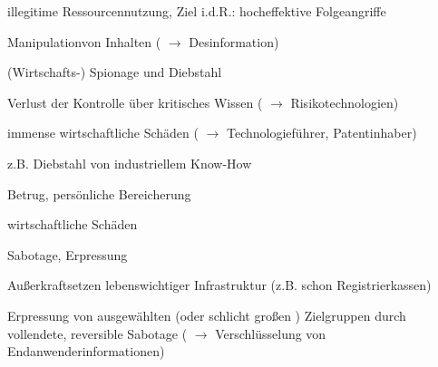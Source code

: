 \documentclass[a4paper]{article}
\begin{document}
\begin{multicols}{3}
    \begin{itemize*}
        \item
        illegitime Ressourcennutzung, Ziel i.d.R.: hocheffektive Folgeangriffe
        \item
        Manipulationvon Inhalten ( $\rightarrow$
        Desinformation)
    \end{itemize*}

    \begin{enumerate*}
        \setcounter{enumi}{2}
        \item
              (Wirtschafts-) Spionage und Diebstahl
    \end{enumerate*}

    \begin{itemize*}
        \item
        Verlust der Kontrolle über kritisches Wissen
        ( $\rightarrow$ Risikotechnologien)
        \item
        immense wirtschaftliche Schäden ( $\rightarrow$
        Technologieführer, Patentinhaber)
        \item
        z.B. Diebstahl von industriellem Know-How
    \end{itemize*}

    \begin{enumerate*}
        \setcounter{enumi}{3}
        \item
        Betrug, persönliche Bereicherung
    \end{enumerate*}

    \begin{itemize*}
        \item
        wirtschaftliche Schäden
    \end{itemize*}

    \begin{enumerate*}
        \setcounter{enumi}{4}
        \item
        Sabotage, Erpressung
    \end{enumerate*}

    \begin{itemize*}
        \item
        Außerkraftsetzen lebenswichtiger Infrastruktur (z.B. schon
        Registrierkassen)
        \item
        Erpressung von ausgewählten (oder schlicht großen ) Zielgruppen durch
        vollendete, reversible Sabotage ( $\rightarrow$
        Verschlüsselung von Endanwenderinformationen)
    \end{itemize*}



\end{multicols}
\end{document}
